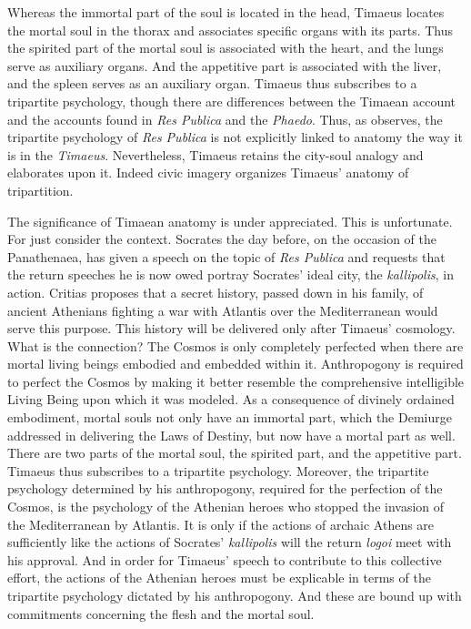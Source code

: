 Whereas the immortal part of the soul is located in the head, Timaeus locates the mortal soul in the thorax and associates specific organs with its parts. Thus the spirited part of the mortal soul is associated with the heart, and the lungs serve as auxiliary organs. And the appetitive part is associated with the liver, and the spleen serves as an auxiliary organ. Timaeus thus subscribes to a tripartite psychology, though there are differences between the Timaean account and the accounts found in \emph{Res Publica} and the \emph{Phaedo}. Thus, as \citet[496]{Taylor:1928qb} observes, the tripartite psychology of \emph{Res Publica} is not explicitly linked to anatomy the way it is in the \emph{Timaeus}. Nevertheless, Timaeus retains the city-soul analogy and elaborates upon it. Indeed civic imagery organizes Timaeus' anatomy of tripartition.

The significance of Timaean anatomy is under appreciated. This is unfortunate. For just consider the context. Socrates the day before, on the occasion of the Panathenaea, has given a speech on the topic of \emph{Res Publica} and requests that the return speeches he is now owed portray Socrates' ideal city, the \emph{kallipolis}, in action. Critias proposes that a secret history, passed down in his family, of ancient Athenians fighting a war with Atlantis over the Mediterranean would serve this purpose. This history will be delivered only after Timaeus' cosmology. What is the connection? The Cosmos is only completely perfected when there are mortal living beings embodied and embedded within it. Anthropogony is required to perfect the Cosmos by making it better resemble the comprehensive intelligible Living Being upon which it was modeled. As a consequence of divinely ordained embodiment, mortal souls not only have an immortal part, which the Demiurge addressed in delivering the Laws of Destiny, but now have a mortal part as well. There are two parts of the mortal soul, the spirited part, and the appetitive part. Timaeus thus subscribes to a tripartite psychology. Moreover, the tripartite psychology determined by his anthropogony, required for the perfection of the Cosmos, is the psychology of the Athenian heroes who stopped the invasion of the Mediterranean by Atlantis. It is only if the actions of archaic Athens are sufficiently like the actions of Socrates' \emph{kallipolis} will the return \emph{logoi} meet with his approval. And in order for Timaeus' speech to contribute to this collective effort, the actions of the Athenian heroes must be explicable in terms of the tripartite psychology dictated by his anthropogony. And these are bound up with commitments concerning the flesh and the mortal soul.

